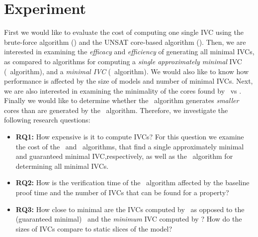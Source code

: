 \section{Experiment}
\label{sec:experiment}

\newcommand{\takeaway}[1]{
\vspace{6pt}
\noindent\fbox{\parbox{\textwidth}{#1}}
\vspace{6pt}
}
First we would like to evaluate the cost of computing one single IVC using the brute-force
algorithm (\ucbfalg) and the UNSAT core-based algorithm (\ucalg).
Then, we are interested in examining the {\em efficacy} and {\em efficiency} of generating all minimal IVCs, as compared to algorithms for computing a {\em single approximately minimal} IVC (\ucalg\ algorithm), and a {\em minimal IVC} (\ucbfalg\ algorithm).  We would also like to know how performance is affected by the size of models and number of minimal IVCs.  Next, we are also interested in examining the minimality of the cores found by \ucbfalg\ vs  \ucalg . Finally we would like to determine whether the \aivcalg\ algorithm generates {\em smaller} cores than are generated by the \ucbfalg\ algorithm.  %
%
%
Therefore, we investigate the following research questions:
\begin{itemize}
  \item \textbf{RQ1:} How expensive is it to compute IVCs?  For this question we examine the cost of the \ucalg ~and \ucbfalg ~algorithms, that find a single approximately minimal and guaranteed minimal IVC,respectively, as well as the \aivcalg ~algorithm for determining all minimal IVCs.
  \item \textbf{RQ2:} How is the verification time of the \aivcalg ~algorithm affected by the baseline proof time and the number of IVCs that can be found for a property?
   \item \textbf{RQ3:} How close to minimal are the IVCs computed by \ucalg\ as opposed to the (guaranteed minimal) \ucbfalg\ and the \emph{minimum} IVC computed by \aivcalg ?  How do the sizes of IVCs compare to static slices of the model?
%
\end{itemize}


